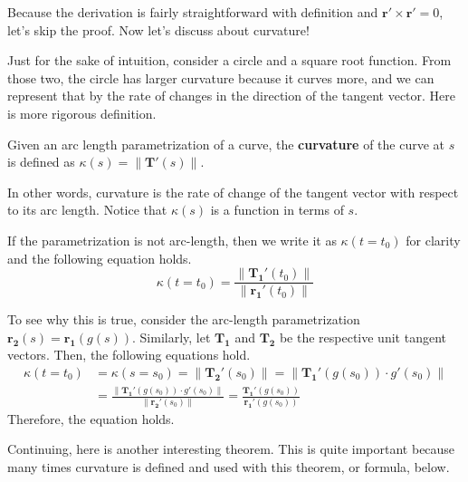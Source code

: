 \documentclass[../../../main.tex]{subfiles}
\begin{document}
Because the derivation is fairly straightforward with definition
and $\mathbf{r}' \times \mathbf{r}' = 0$, let's skip the proof.
Now let's discuss about curvature!

Just for the sake of intuition, consider a circle and a square root
function. From those two, the circle has larger curvature because
it curves more, and we can represent that by the rate of changes in
the direction of the tangent vector. Here is more rigorous definition.

\begin{definition}{}{}
Given an arc length parametrization of a curve, the \textbf{curvature}
of the curve at $s$ is defined as $\kappa(s) = \| \mathbf{T}'(s) \|$.
\end{definition}

In other words, curvature is the rate of change of the tangent vector
with respect to its arc length. Notice that $\kappa(s)$ is a function
in terms of $s$.

\begin{important}
If the parametrization is not arc-length, then we write it as
$\kappa(t = t_0)$ for clarity and the following equation holds.
\vspace{-0.6\baselineskip}
\[
\kappa(t = t_0)
= \frac{\| \mathbf{T_1}' (t_0) \|}{\| \mathbf{r_1}' (t_0) \|}
\]
\end{important}

To see why this is true, consider the arc-length parametrization
$\mathbf{r_2}(s) = \mathbf{r_1}(g(s))$. Similarly, let $\mathbf{T_1}$
and $\mathbf{T_2}$ be the respective unit tangent vectors.
Then, the following equations hold.
\begin{align*}
    \kappa(t = t_0)
    &= \kappa(s = s_0)
    = \| \mathbf{T_2}'(s_0) \|
    = \| \mathbf{T_1}'(g(s_0)) \cdot g'(s_0) \| \\
    &= \frac{\| \mathbf{T_1}'(g(s_0)) \cdot g'(s_0) \|}
        {\| \mathbf{r_2}'(s_0) \|}
    = \frac{\mathbf{T_1}'(g(s_0))}{\mathbf{r_1}'(g(s_0))}
\end{align*}
Therefore, the equation holds.

Continuing, here is another interesting theorem. This is quite
important because many times curvature is defined and used with this
theorem, or formula, below.
\end{document}
